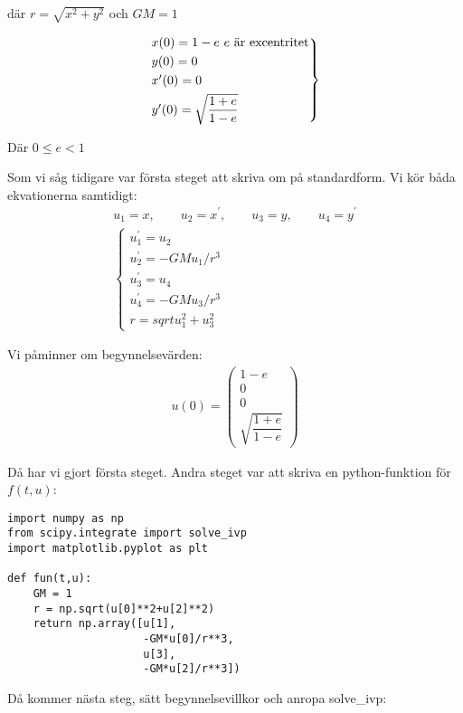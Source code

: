 \noindent där $r=\sqrt{x^2+y^2}$ och $GM = 1$\par
\begin{equation*}
  \begin{gathered}
    \begin{rcases*}
      x(0)=1-e \text{ $e$ är excentritet}\\
      y(0)=0\\
      x^{\prime}(0)=0\\
      y^{\prime}(0)=\sqrt{\dfrac{1+e}{1-e}}
    \end{rcases*}
  \end{gathered}
\end{equation*}
\par
\noindent Där $0\leq e<1$
\par\bigskip
\noindent Som vi såg tidigare var första steget att skriva om på standardform. Vi kör båda ekvationerna samtidigt:
\begin{equation*}
  \begin{gathered}
    u_1 = x,\qquad u_2 = x^{\prime},\qquad u_3 = y,\qquad u_4 = y^{\prime}\\
    \begin{cases*}
      u_1^{\prime} = u_2\\
      u_2^{\prime} = -GMu_1/r^3\\
      u_3^{\prime} = u_4\\
      u_4^{\prime} = -GMu_3/r^3\\
      r = sqrt{u_1^2+u_3^2}
    \end{cases*}
  \end{gathered}
\end{equation*}
\par\bigskip
\noindent Vi påminner om begynnelsevärden:
\begin{equation*}
  \begin{gathered}
    u(0)= \begin{pmatrix}1-e\\0\\0\\\sqrt{\dfrac{1+e}{1-e}}\end{pmatrix}
  \end{gathered}
\end{equation*}
\par\bigskip
\noindent Då har vi gjort första steget. Andra steget var att skriva en python-funktion för $f(t,u)$:
\par\bigskip

\begin{verbatim}
import numpy as np
from scipy.integrate import solve_ivp
import matplotlib.pyplot as plt

def fun(t,u):
    GM = 1
    r = np.sqrt(u[0]**2+u[2]**2)
    return np.array([u[1],
                     -GM*u[0]/r**3,
                     u[3],
                     -GM*u[2]/r**3])

\end{verbatim}
\par\bigskip
\noindent Då kommer nästa steg, sätt begynnelsevillkor och anropa solve\_ivp:
\par\bigskip

